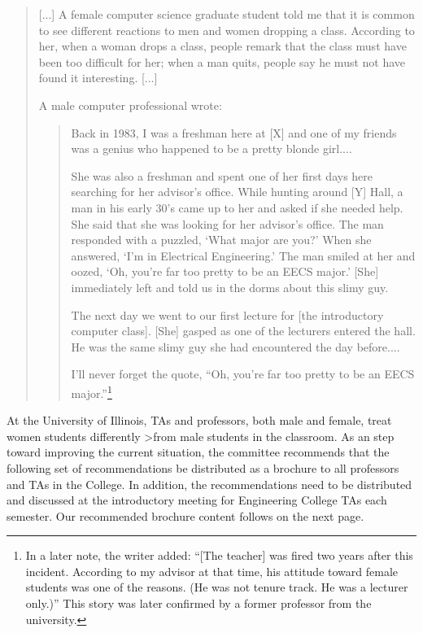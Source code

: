 \begin{quote}
\begin{quote}
\end{quote}
[...]
A female computer science graduate student told me that
    it is common to see different reactions to men and women
    dropping a class. According to her, when a woman drops
    a class, people remark that the class must have been too
    difficult for her; when a man quits, people say he must
    not have found it interesting.
[...]

A male computer professional wrote:

\begin{quote}

            Back in 1983, I was a freshman here at [X]
         and one of my friends was a genius who happened to be a pretty blonde girl....

            She was also a freshman and spent one of
         her first days here searching for her advisor's
         office.  While hunting around [Y] Hall, a man
         in his early 30's came up to her and asked if
         she needed help. She said that she was looking
         for her advisor's office.  The man responded
         with a puzzled, `What major are you?' When
         she answered, `I'm in Electrical Engineering.'
         The man smiled at her and oozed, `Oh, you're
         far too pretty to be an EECS major.'  [She]
         immediately left and told us in the dorms about
         this slimy guy.

            The next day we went to our first lecture for
         [the introductory computer class]. [She] gasped
         as one of the lecturers entered the hall. He was
         the same slimy guy she had encountered the
         day before....

            I'll never forget the quote, ``Oh, you're far
         too pretty to be an EECS major.''\footnote{In a later note, the writer added: ``[The teacher] was fired two years
after this incident.  According to my advisor at that time, his attitude
toward female students was one of the reasons. (He was not tenure track.
He was a lecturer only.)''  This story was later confirmed by a former
professor from the university.}



\end{quote}
\end{quote}

At the University of Illinois,
TAs and professors, both male and female, treat women students differently
>from male students in the classroom.
As an step toward improving the current situation, the committee
recommends that the following set of recommendations be distributed
as a brochure
to all professors and TAs in the College.  In addition, the 
recommendations need to be distributed and
discussed at the introductory meeting
for Engineering College TAs each semester.
Our recommended brochure content follows on the next page.

